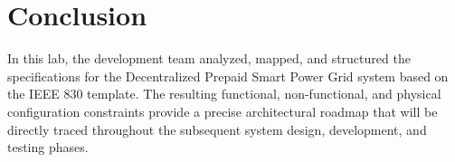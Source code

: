 \section{Conclusion}
In this lab, the development team analyzed, mapped, and structured the specifications for the Decentralized Prepaid Smart Power Grid system based on the IEEE 830 template. The resulting functional, non-functional, and physical configuration constraints provide a precise architectural roadmap that will be directly traced throughout the subsequent system design, development, and testing phases.  
